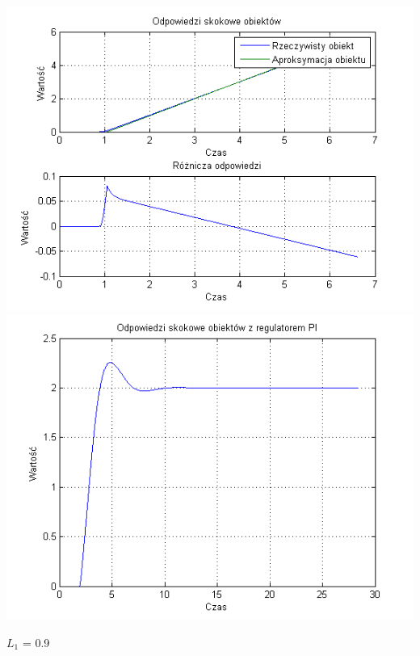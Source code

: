 \documentclass[10pt,a4paper]{article}
\begin{document}
\begin{center}
\includegraphics[scale=1]{images/jeden/skrypt_149.png}\\
\includegraphics[scale=1]{images/jeden/skrypt_150.png}\\
\end{center}
\newpage
$L_1$ = 0.9
\end{document}
